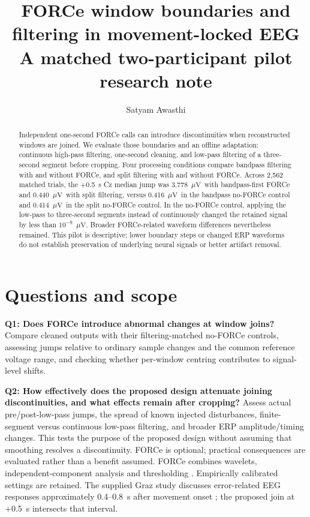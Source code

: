 \documentclass[11pt,a4paper]{article}
\title{FORCe window boundaries and filtering in movement-locked EEG\\[3pt]\large A matched two-participant pilot research note}
\author{Satyam Awasthi}\date{}
\newcommand{\uv}{\ensuremath{\mu\mathrm{V}}}
\begin{document}
\maketitle
\begin{abstract}
Independent one-second FORCe calls can introduce discontinuities when reconstructed windows are joined. We evaluate those boundaries and an offline adaptation: continuous high-pass filtering, one-second cleaning, and low-pass filtering of a three-second segment before cropping. Four processing conditions compare bandpass filtering with and without FORCe, and split filtering with and without FORCe. Across 2,562 matched trials, the +0.5~s Cz median jump was 3.778~\uv\ with bandpass-first FORCe and 0.440~\uv\ with split filtering, versus 0.416~\uv\ in the bandpass no-FORCe control and 0.414~\uv\ in the split no-FORCe control. In the no-FORCe control, applying the low-pass to three-second segments instead of continuously changed the retained signal by less than $10^{-9}$~\uv. Broader FORCe-related waveform differences nevertheless remained. This pilot is descriptive; lower boundary steps or changed ERP waveforms do not establish preservation of underlying neural signals or better artifact removal.
\end{abstract}
\section{Questions and scope}
\textbf{Q1: Does FORCe introduce abnormal changes at window joins?} Compare cleaned outputs with their filtering-matched no-FORCe controls, assessing jumps relative to ordinary sample changes and the common reference voltage range, and checking whether per-window centring contributes to signal-level shifts.

\textbf{Q2: How effectively does the proposed design attenuate joining discontinuities, and what effects remain after cropping?} Assess actual pre/post-low-pass jumps, the spread of known injected disturbances, finite-segment versus continuous low-pass filtering, and broader ERP amplitude/timing changes. This tests the purpose of the proposed design without assuming that smoothing resolves a discontinuity. FORCe is optional; practical consequences are evaluated rather than a benefit assumed.
FORCe combines wavelets, independent-component analysis and thresholding \cite{daly}. Empirically calibrated settings are retained. The supplied Graz study discusses error-related EEG responses approximately 0.4--0.8~s after movement onset \cite{graz}; the proposed join at +0.5~s intersects that interval.
\end{document}
